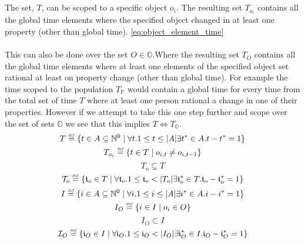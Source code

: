 \documentclass[]{article}
\newcommand{\defeq}{\stackrel{\smash{\scriptscriptstyle\mathit{def}}}{=}}
\begin{document}
\\
\\ 
The set, $T$, can be scoped to a specific object $o_{i}$. The resulting set $T_{o_{i}}$ contains all the global time elements where the specified object changed in at least one property (other than global time). \eqref{eq:object_element_time}
\\
\\
This can also be done over the set $O \in \mathbb{O}$.Where the resulting set $T_{O}$ contains all the global time elements where at least one elements of the specified object set rational at least on property change (other than global time). For example the time scoped to the population $T_{\mathbb{P}}$ would contain a global time for every time from the total set of time $T$ where at least one person rational a change in one of their properties. However if we attempt to take this one step further and scope over the set of sets $\mathbb{O}$ we see that this implies $T \Longleftrightarrow T_{\mathbb{O}}$. 
\begin{equation} \label{eq:global_times} 
T \defeq \{ t \in A \subseteq \mathbb{N}^{0} \mid \forall t.1 \leq t \leq |A|\exists t^{*} \in A.t-t^{*}=1 \} 
\end{equation}
\begin{equation} \label{eq:object_element_times}
T_{o_{i}} \defeq \{ t \in T \mid o_{i, t} \ne o_{i, t-1} \}
\end{equation}
\begin{equation} \label{eq:subset_global_times}
T_{o} \subseteq T
\end{equation}
\begin{equation} \label{eq:relative_object_times} 
\mathcal{T}_{o} \defeq \{ \mathfrak{t}_{o} \in T \mid \forall \mathfrak{t}_{o}.1 \leq \mathfrak{t}_{o}  < |T_{o}| \exists \mathfrak{t}^{*}_{o} \in T.\mathfrak{t}_{o}-\mathfrak{t}^{*}_{o}=1 \} 
\end{equation}
%
\begin{equation} \label {eq:global_identities}
I \defeq \{ i \in A \subseteq \mathbb{N}^{0} \mid \forall i.1 \leq i \leq |A|\exists i^{*} \in A.i-i^{*}=1 \}
\end{equation}
\begin{equation} \label {eq:object_identities}
I_{O} \defeq \{ i \in I \mid o_{i} \in O \}
\end{equation}
\begin{equation} \label {eq:subset_global_identities}
I_{O} \subset I
\end{equation}
\begin{equation} \label{eq:relative_object_identities}
\mathcal{I}_{O} \defeq \{ \mathfrak{i}_{O} \in I \mid \forall \mathfrak{i}_{O}.1 \leq \mathfrak{i}_{O} < |I_{O}| \exists \mathfrak{i}^{*}_{O} \in I.\mathfrak{i}_{O}-\mathfrak{i}^{*}_{O}=1 \} 
\end{equation}
\end{document}
